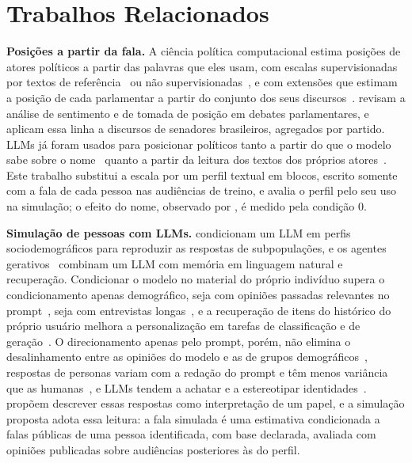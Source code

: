 \section{Trabalhos Relacionados}
\label{sec:relacionados}

\textbf{Posições a partir da fala.} A ciência política computacional estima posições de atores
políticos a partir das palavras que eles usam, com escalas supervisionadas por textos de
referência~\citep{laver2003extracting} ou não supervisionadas~\citep{slapin2008scaling}, e com
extensões que estimam a posição de cada parlamentar a partir do conjunto dos seus
discursos~\citep{lauderdale2016measuring}. \citet{abercrombie2020sentiment} revisam a análise de
sentimento e de tomada de posição em debates parlamentares, e \citet{izumi2021government} aplicam essa
linha a discursos de senadores brasileiros, agregados por partido. LLMs já foram usados para
posicionar políticos tanto a partir do que o modelo sabe sobre o nome~\citep{wu2023large} quanto a
partir da leitura dos textos dos próprios atores~\citep{lemens2025positioning}. Este trabalho
substitui a escala por um perfil textual em blocos, escrito somente com a fala de cada pessoa nas
audiências de treino, e avalia o perfil pelo seu uso na simulação; o efeito do nome, observado por
\citet{wu2023large}, é medido pela condição 0.

\textbf{Simulação de pessoas com LLMs.} \citet{argyle2023outofone} condicionam um LLM em perfis
sociodemográficos para reproduzir as respostas de subpopulações, e os agentes
gerativos~\citep{park2023generative} combinam um LLM com memória em linguagem natural e recuperação.
Condicionar o modelo no material do próprio indivíduo supera o condicionamento apenas demográfico,
seja com opiniões passadas relevantes no prompt~\citep{hwang2023aligning}, seja com entrevistas
longas~\citep{park2026llm}, e a recuperação de itens do histórico do próprio usuário melhora a
personalização em tarefas de classificação e de geração~\citep{salemi2024lamp}. O direcionamento
apenas pelo prompt, porém, não elimina o desalinhamento entre as opiniões do modelo e as de grupos
demográficos~\citep{santurkar2023whose}, respostas de personas variam com a redação do prompt e têm
menos variância que as humanas~\citep{bisbee2024synthetic}, e LLMs tendem a achatar e a estereotipar
identidades~\citep{wang2025large}. \citet{shanahan2023role} propõem descrever essas respostas como
interpretação de um papel, e a simulação proposta adota essa leitura: a fala simulada é uma
estimativa condicionada a falas públicas de uma pessoa identificada, com base declarada, avaliada com
opiniões publicadas sobre audiências posteriores às do perfil.

